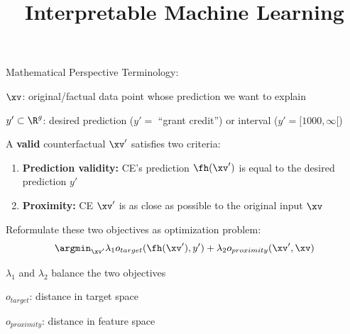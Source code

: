 \documentclass[10pt,compress,t,notes=noshow, xcolor=table]{beamer}
\title{Interpretable Machine Learning}
\begin{document}






\begin{framev}[align=top]{Mathematical Perspective}
Terminology:
\begin{itemizeM}
\item $\xv$: original/factual data point whose prediction we want to explain
\item $y' \subset \R^g$: desired prediction ($y' =$ ``grant credit'') or interval ($y' = [1000, \infty[$)
\end{itemizeM}
\pause
\spacer[0.25]
A \textbf{valid} counterfactual $\xv'$ satisfies two criteria:
\begin{enumerate}
\item \textbf{Prediction validity:} CE's prediction $\fh(\xv')$ is equal to the desired prediction $y'$
\item \textbf{Proximity:} CE $\xv'$ is as close as possible to the original input $\xv$
\end{enumerate}
\pause
\spacer[0.25]
Reformulate these two objectives as optimization problem:\\
\spacer[0.25]
$$
\argmin_{\xv'} \lambda_1 o_{target}(\fh(\xv'), y') + \lambda_2 o_{proximity}(\xv', \xv)
$$
\begin{itemizeM}
\item $\lambda_1$ and $\lambda_2$ balance the two objectives
\item $o_{target}$: distance in target space
\item $o_{proximity}$: distance in feature space
\end{itemizeM}
\end{framev}
\end{document}
